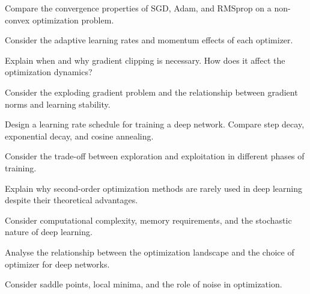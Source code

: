 \begin{exercisebox}[hard]
\begin{problem}
Compare the convergence properties of SGD, Adam, and RMSprop on a non-convex optimization problem.
\end{problem}
\begin{hintbox}
Consider the adaptive learning rates and momentum effects of each optimizer.
\end{hintbox}
\end{exercisebox}


\begin{exercisebox}[hard]
\begin{problem}
Explain when and why gradient clipping is necessary. How does it affect the optimization dynamics?
\end{problem}
\begin{hintbox}
Consider the exploding gradient problem and the relationship between gradient norms and learning stability.
\end{hintbox}
\end{exercisebox}


\begin{exercisebox}[hard]
\begin{problem}
Design a learning rate schedule for training a deep network. Compare step decay, exponential decay, and cosine annealing.
\end{problem}
\begin{hintbox}
Consider the trade-off between exploration and exploitation in different phases of training.
\end{hintbox}
\end{exercisebox}


\begin{exercisebox}[hard]
\begin{problem}
Explain why second-order optimization methods are rarely used in deep learning despite their theoretical advantages.
\end{problem}
\begin{hintbox}
Consider computational complexity, memory requirements, and the stochastic nature of deep learning.
\end{hintbox}
\end{exercisebox}


\begin{exercisebox}[hard]
\begin{problem}
Analyse the relationship between the optimization landscape and the choice of optimizer for deep networks.
\end{problem}
\begin{hintbox}
Consider saddle points, local minima, and the role of noise in optimization.
\end{hintbox}
\end{exercisebox}


